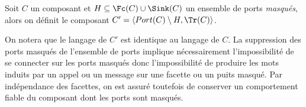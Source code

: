 \begin{definition}
Soit $C$ un composant et $H\subseteq \Fc(C)\cup \Sink(C)$  un ensemble de ports
\emph{masqu\'es}, alors on d\'efinit le composant $C'=\langle Port(C)
\setminus H,\Tr(C) \rangle$.
\end{definition}

On notera que le langage de $C'$ est identique au langage de $C$. La
suppression des ports masqu\'es  de l'ensemble de ports implique
n\'ecessairement l'impossibilit\'e de se connecter sur les ports
masqu\'es donc l'impossibilit\'e de \og produire \fg{} les mots
induits par un appel ou un message sur une facette ou un puits
masqu\'e. Par ind\'ependance des facettes, on est assur\'e
toutefois de conserver un comportement fiable du composant dont les
ports sont masqu\'es. 



